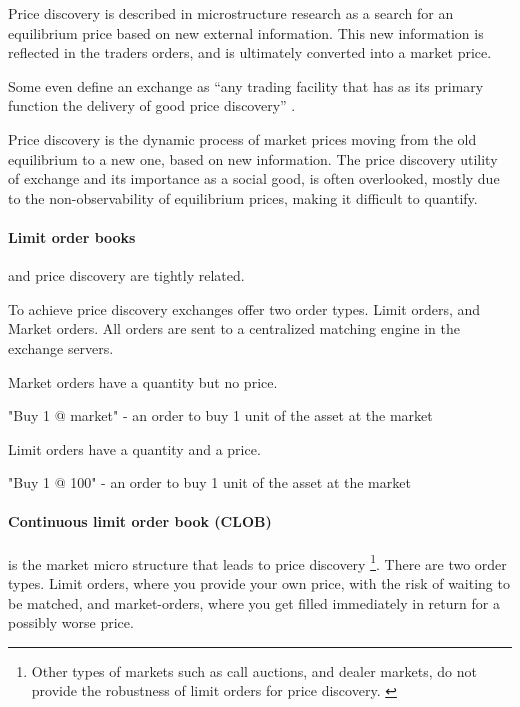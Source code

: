 \documentclass[12pt]{article}
\begin{document}
Price discovery is described in microstructure research as a search for an equilibrium price based on new external information. This new information is reflected in the traders orders, and is ultimately converted into a market price. \citep{RePEc:nbr:nberwo:6257}

Some even define an exchange as ``any trading facility that has as its primary function the delivery of good price discovery'' \cite{francioni_schwartz_2017}. 

Price discovery is the dynamic process of market prices moving from the old equilibrium to a new one, based on new information. The price discovery utility of exchange and its importance as a social good, is often overlooked, mostly due to the non-observability of equilibrium prices, making it difficult to quantify. \cite{francioni_schwartz_2017} \cite{RePEc:udb:wpaper:uwec-2005-01-r} 


\paragraph*{Limit order books} and price discovery are tightly related. \citep{RePEc:nbr:nberwo:6257} \cite{RePEc:eee:jfinec:v:17:y:1986:i:1:p:5-26}

To achieve price discovery exchanges offer two order types. Limit orders, and Market orders. All orders are sent to a centralized matching engine in the exchange servers. 

Market orders have a quantity but no price. 

\begin{enumerate*}
    \item "Buy 1 @ market" - an order to buy 1 unit of the asset at the market  
\end{enumerate*}

Limit orders have a quantity and a price. 

\begin{enumerate*}
    \item "Buy 1 @ 100" - an order to buy 1 unit of the asset at the market  
\end{enumerate*}


\paragraph*{Continuous limit order book (CLOB)}is the market micro structure that leads to price discovery \footnote{Other types of markets such as call auctions, and dealer markets, do not provide the robustness of limit orders for price discovery. \cite{RePEc:hal:journl:hal-00459785}}. There are two order types. Limit orders, where you provide your own price, with the risk of waiting to be matched, and market-orders, where you get filled immediately in return for a possibly worse price.
\end{document}
